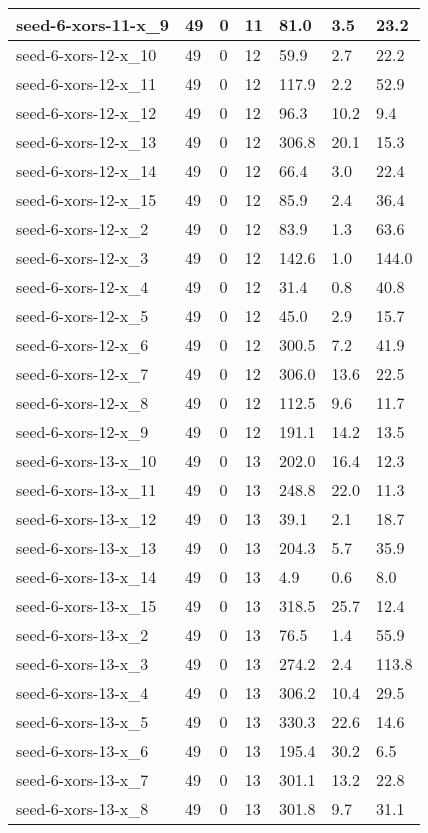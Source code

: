 \begin{scriptsize}
\begin{longtable}{|p{5cm}|l|l|l|l|l|l|}
seed-6-xors-11-x\_9&49&0&11&81.0&3.5&23.2 \\ \hline 
seed-6-xors-12-x\_10&49&0&12&59.9&2.7&22.2 \\ \hline 
seed-6-xors-12-x\_11&49&0&12&117.9&2.2&52.9 \\ \hline 
seed-6-xors-12-x\_12&49&0&12&96.3&10.2&9.4 \\ \hline 
seed-6-xors-12-x\_13&49&0&12&306.8&20.1&15.3 \\ \hline 
seed-6-xors-12-x\_14&49&0&12&66.4&3.0&22.4 \\ \hline 
seed-6-xors-12-x\_15&49&0&12&85.9&2.4&36.4 \\ \hline 
seed-6-xors-12-x\_2&49&0&12&83.9&1.3&63.6 \\ \hline 
seed-6-xors-12-x\_3&49&0&12&142.6&1.0&144.0 \\ \hline 
seed-6-xors-12-x\_4&49&0&12&31.4&0.8&40.8 \\ \hline 
seed-6-xors-12-x\_5&49&0&12&45.0&2.9&15.7 \\ \hline 
seed-6-xors-12-x\_6&49&0&12&300.5&7.2&41.9 \\ \hline 
seed-6-xors-12-x\_7&49&0&12&306.0&13.6&22.5 \\ \hline 
seed-6-xors-12-x\_8&49&0&12&112.5&9.6&11.7 \\ \hline 
seed-6-xors-12-x\_9&49&0&12&191.1&14.2&13.5 \\ \hline 
seed-6-xors-13-x\_10&49&0&13&202.0&16.4&12.3 \\ \hline 
seed-6-xors-13-x\_11&49&0&13&248.8&22.0&11.3 \\ \hline 
seed-6-xors-13-x\_12&49&0&13&39.1&2.1&18.7 \\ \hline 
seed-6-xors-13-x\_13&49&0&13&204.3&5.7&35.9 \\ \hline 
seed-6-xors-13-x\_14&49&0&13&4.9&0.6&8.0 \\ \hline 
seed-6-xors-13-x\_15&49&0&13&318.5&25.7&12.4 \\ \hline 
seed-6-xors-13-x\_2&49&0&13&76.5&1.4&55.9 \\ \hline 
seed-6-xors-13-x\_3&49&0&13&274.2&2.4&113.8 \\ \hline 
seed-6-xors-13-x\_4&49&0&13&306.2&10.4&29.5 \\ \hline 
seed-6-xors-13-x\_5&49&0&13&330.3&22.6&14.6 \\ \hline 
seed-6-xors-13-x\_6&49&0&13&195.4&30.2&6.5 \\ \hline 
seed-6-xors-13-x\_7&49&0&13&301.1&13.2&22.8 \\ \hline 
seed-6-xors-13-x\_8&49&0&13&301.8&9.7&31.1 \\ \hline 

\end{longtable}
\end{scriptsize}
